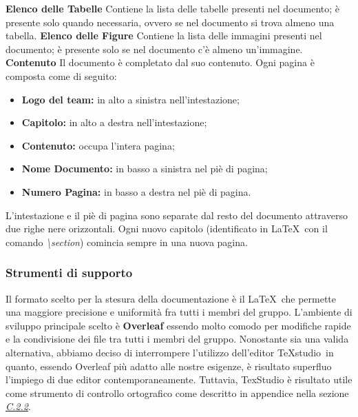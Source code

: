 		\newline \newline \textbf{Elenco delle Tabelle} Contiene la lista delle tabelle presenti nel documento; è presente solo quando necessaria, ovvero se nel documento si trova almeno una tabella.
		\newline \newline \textbf{Elenco delle Figure} Contiene la lista delle immagini presenti nel documento; è presente solo se nel documento c'è almeno un'immagine.
		\newline \newline \textbf{Contenuto}  Il documento è completato dal suo contenuto. Ogni pagina è composta come di seguito:\newline
		\begin{itemize}
			\item \textbf{Logo del team:} in alto a sinistra nell'intestazione;
			\item \textbf{Capitolo:} in alto a destra nell'intestazione;
			\item \textbf{Contenuto:} occupa l'intera pagina;
			\item \textbf{Nome Documento:} in basso a sinistra nel piè di pagina;
			\item \textbf{Numero Pagina:} in basso a destra nel piè di pagina. \newline
		\end{itemize}
		L'intestazione e il piè di pagina sono separate dal resto del documento attraverso due righe nere orizzontali. Ogni nuovo capitolo (identificato in \LaTeX ~con il comando \textit{\textbackslash{}section}) comincia sempre in una nuova pagina.
		\subsubsection{Strumenti di supporto}
		\label{3.1.8}
			Il formato scelto per la stesura della documentazione è il  \LaTeX\pedice ~che permette una maggiore precisione e uniformità fra tutti i membri del gruppo. L'ambiente di sviluppo principale scelto è \textbf{Overleaf\pedice} essendo molto comodo per modifiche rapide e la condivisione dei file tra tutti i membri del gruppo.
			Nonostante sia una valida alternativa, abbiamo deciso di interrompere l'utilizzo dell'editor TeXstudio\pedice ~in quanto, essendo Overleaf più adatto alle nostre esigenze, è risultato superfluo l'impiego di due editor contemporaneamente.\newline
			Tuttavia, TexStudio è risultato utile come strumento di controllo ortografico come descritto in appendice nella sezione \hyperref[C.2.2]{\textit{\underline{C.2.2}}}.
